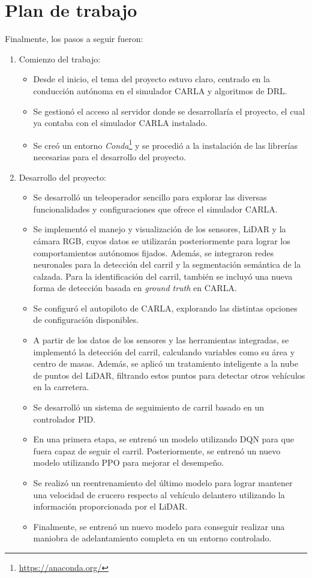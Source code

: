 \section{Plan de trabajo}
\label{sec:plantrabajo}

Finalmente, los pasos a seguir fueron:

\begin{enumerate}
\item Comienzo del trabajo:
\begin{itemize}
\item Desde el inicio, el tema del proyecto estuvo claro, centrado en la conducción autónoma en el simulador CARLA y algoritmos de \ac{DRL}.
\item Se gestionó el acceso al servidor donde se desarrollaría el proyecto, el cual ya contaba con el simulador CARLA instalado. 
\item Se creó un entorno \textit{Conda}\footnote{\url{https://anaconda.org/}} y se procedió a la instalación de las librerías necesarias para el desarrollo del proyecto.
\end{itemize}

\item Desarrollo del proyecto:
\begin{itemize}
\item Se desarrolló un teleoperador sencillo para explorar las diversas funcionalidades y configuraciones que ofrece el simulador CARLA.
\item Se implementó el manejo y visualización de los sensores, \ac{LiDAR} y la cámara RGB, cuyos datos se utilizarán posteriormente para lograr los comportamientos autónomos fijados. Además, se integraron redes neuronales para la detección del carril y la segmentación semántica de la calzada. Para la identificación del carril, también se incluyó una nueva forma de detección basada en \textit{ground truth} en CARLA. 
\item Se configuró el autopiloto de CARLA, explorando las distintas opciones de configuración disponibles.
\item A partir de los datos de los sensores y las herramientas integradas, se implementó la detección del carril, calculando variables como su área y centro de masas. Además, se aplicó un tratamiento inteligente a la nube de puntos del \ac{LiDAR}, filtrando estos puntos para detectar otros vehículos en la carretera.
\item Se desarrolló un sistema de seguimiento de carril basado en un controlador \ac{PID}.
\item En una primera etapa, se entrenó un modelo utilizando \ac{DQN} para que fuera capaz de seguir el carril. Posteriormente, se entrenó un nuevo modelo utilizando \ac{PPO} para mejorar el desempeño.
\item Se realizó un reentrenamiento del último modelo para lograr mantener una velocidad de crucero respecto al vehículo delantero utilizando la información proporcionada por el \ac{LiDAR}.
\item Finalmente, se entrenó un nuevo modelo para conseguir realizar una maniobra de adelantamiento completa en un entorno controlado.
\end{itemize}


\end{enumerate}
